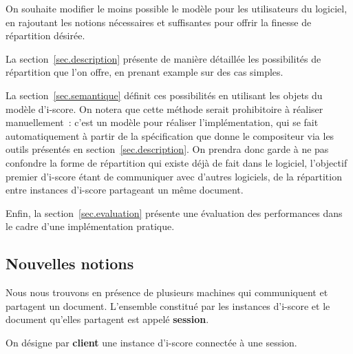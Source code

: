 \documentclass{article}
\newcommand\vocab[1]{\textbf{#1}}
\begin{document}
On souhaite modifier le moins possible le modèle pour les utilisateurs du logiciel, 
en rajoutant les notions nécessaires et suffisantes pour offrir la finesse de répartition désirée.

La section~\ref{sec.description} présente de manière détaillée les possibilités 
de répartition que l'on offre, en prenant example sur des cas simples.

La section~\ref{sec.semantique} définit ces possibilités en utilisant les objets du modèle d'i-score. 
On notera que cette méthode serait prohibitoire à réaliser manuellement~: c'est un modèle pour réaliser l'implémentation, qui se fait automatiquement à partir de la spécification que donne le compositeur via les outils présentés en section~\ref{sec.description}. 
On prendra donc garde à ne pas confondre la forme de répartition qui existe déjà de fait dans le logiciel, l'objectif premier d'i-score étant de communiquer avec d'autres logiciels, de la répartition entre instances d'i-score partageant un même document.

Enfin, la section~\ref{sec.evaluation} présente une évaluation des performances dans le cadre 
d'une implémentation pratique.








\subsection{Nouvelles notions}
Nous nous trouvons en présence de plusieurs machines qui communiquent et partagent un document.
L'ensemble constitué par les instances d'i-score et le document qu'elles partagent est appelé \vocab{session}.

On désigne par \vocab{client} une instance d'i-score connectée à une session.
\end{document}
